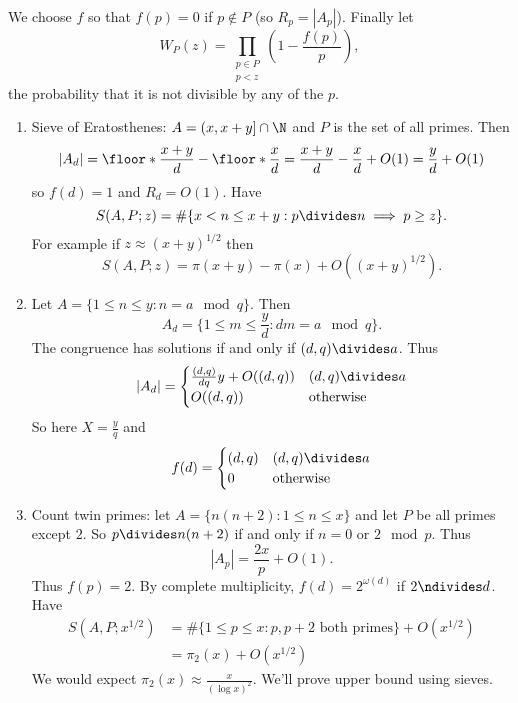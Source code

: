 \documentclass[a4paper]{article}
\begin{document}
We choose \(f\) so that \(f(p) = 0\) if \(p \notin P\) (so \(R_p = |A_p|\)). Finally let
\[
  W_P(z) = \prod_{\substack{p \in P \\ p < z}} \left( 1 - \frac{f(p)}{p} \right),
\]
the probability that it is not divisible by any of the \(p\).

\begin{eg}\leavevmode
  \begin{enumerate}
  \item Sieve of Eratosthenes: \(A = (x, x + y] \cap \N\) and \(P\) is the set of all primes. Then
    \[
      |A_d|
      = \floor*{\frac{x + y}{d}} - \floor*{\frac{x}{d}}
      = \frac{x + y}{d} - \frac{x}{d} + O(1)
      = \frac{y}{d} + O(1)
    \]
    so \(f(d) = 1\) and \(R_d = O(1)\). Have
    \[
      S(A, P; z) = \#\{x < n \leq x + y: p \divides n \implies p \geq z\}.
    \]
    For example if \(z \approx (x + y)^{1/2}\) then
    \[
      S(A, P; z) = \pi(x + y) - \pi(x) + O((x + y)^{1/2}).
    \]
  \item Let \(A = \{1 \leq n \leq y: n = a \mod q\}\). Then
    \[
      A_d = \{1 \leq m \leq \frac{y}{d}: dm = a \mod q\}.
    \]
    The congruence has solutions if and only if \((d, q) \divides a\). Thus
    \[
      |A_d| =
      \begin{cases}
        \frac{(d, q)}{dq} y + O((d, q)) & (d, q) \divides a \\
        O((d, q)) & \text{otherwise}
      \end{cases}
    \]
    So here \(X = \frac{y}{q}\) and
    \[
      f(d) =
      \begin{cases}
        (d, q) & (d, q) \divides a \\
        0 & \text{otherwise}
      \end{cases}
    \]
  \item Count twin primes: let \(A = \{n (n + 2): 1 \leq n \leq x\}\) and let \(P\) be all primes except \(2\). So \(p \divides n(n + 2)\) if and only if \(n = 0 \text{ or } 2 \mod p\). Thus
    \[
      |A_p| = \frac{2x}{p} + O(1).
    \]
    Thus \(f(p) = 2\). By complete multiplicity, \(f(d) = 2^{\omega(d)}\) if \(2 \ndivides d\). Have
    \begin{align*}
      S(A, P; x^{1/2})
      &= \#\{1 \leq p \leq x: p, p + 2 \text{ both primes}\} + O(x^{1/2}) \\
      &= \pi_2(x) + O(x^{1/2})
    \end{align*}
    We would expect \(\pi_2(x) \approx \frac{x}{(\log x)^2}\). We'll prove upper bound using sieves.
  \end{enumerate}
\end{eg}
\end{document}
